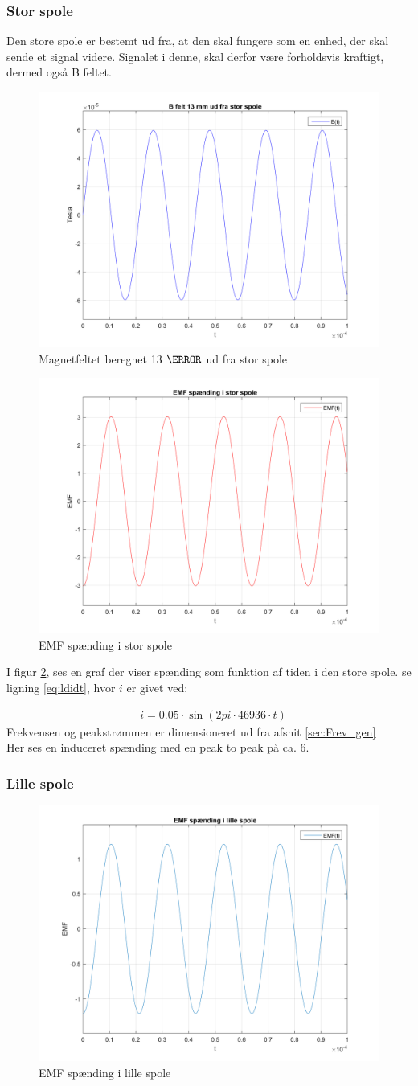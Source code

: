 \subsubsection{Stor spole}

Den store spole er bestemt ud fra, at den skal fungere som en enhed, der skal sende et signal videre. 
Signalet i denne, skal derfor være forholdsvis kraftigt, dermed også B feltet.
\begin{figure}[h!]
	\centering
	\includegraphics[width=.3\textwidth]{billeder/B_felt_stor_spole.png}
	\caption{Magnetfeltet beregnet 13 $\mm$ ud fra stor spole}
	\label{fig:B_felt_stor_spole}
\end{figure}

\begin{figure}[h!]
	\centering
	\includegraphics[width=.3\textwidth]{billeder/EMF_stor_spole.png}
	\caption{EMF spænding i stor spole}
	\label{fig:EMF_stor_spole}
\end{figure}
I figur \ref{fig:EMF_stor_spole}, ses en graf der viser spænding som funktion af tiden i den store spole. se ligning \ref{eq:ldidt}, hvor $i$ er givet ved: 

\begin{align}
&i=0.05\cdot \sin{(2pi\cdot 46936\cdot t)}
\end{align}
Frekvensen og peakstrømmen er dimensioneret ud fra afsnit \ref{sec:Frev_gen} \\
Her ses en induceret spænding med en peak to peak på ca. 6\volt.
\subsubsection{Lille spole}
\begin{figure}[h!]
	\centering
	\includegraphics[width=.6\textwidth]{billeder/EMF_lille_spole.png}
	\caption{EMF spænding i lille spole}
	\label{fig:EMF_lille_spole}
\end{figure}





